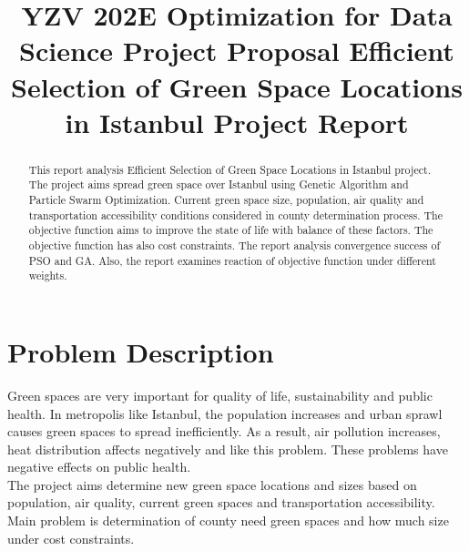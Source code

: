 \documentclass[conference]{IEEEtran}
\begin{document}
\title{YZV 202E Optimization for Data Science Project Proposal Efficient Selection of Green Space Locations in Istanbul Project Report}

\author{
\and
{}
\and
{}
}

\maketitle

\begin{abstract}
This report analysis Efficient Selection of Green Space Locations in Istanbul project. The project aims spread green space over Istanbul using Genetic Algorithm and Particle Swarm Optimization. Current green space size, population, air quality and transportation accessibility conditions considered in county determination process. The objective function aims to improve the state of life with balance of these factors. The objective function has also cost constraints. The report analysis convergence success of PSO and GA. Also, the report examines reaction of objective function under different weights. 
\end{abstract}

\section{Problem Description}
Green spaces are very important for quality of life, sustainability and public health. In metropolis like Istanbul, the population increases and urban sprawl causes green spaces to spread inefficiently. As a result, air pollution increases, heat distribution affects negatively and like this problem. These problems have negative effects on public health.\\
The project aims determine new green space locations and sizes based on population, air quality, current green spaces and transportation accessibility. Main problem is determination of county need green spaces and how much size under cost constraints. 
\end{document}
